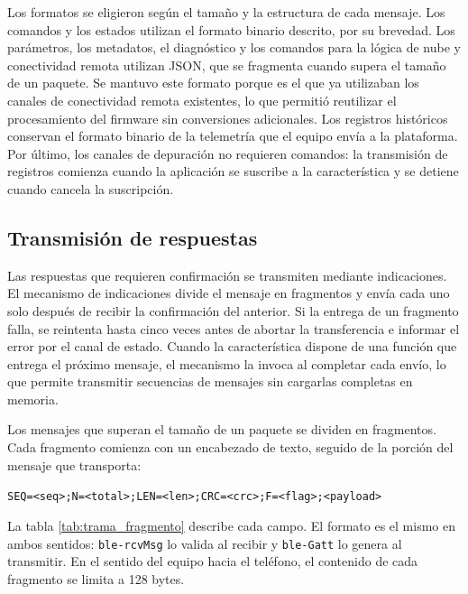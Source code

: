 Los formatos se eligieron según el tamaño y la estructura de cada mensaje. Los comandos y los estados utilizan el formato binario descrito, por su brevedad. Los parámetros, los metadatos, el diagnóstico y los comandos para la lógica de nube y conectividad remota utilizan JSON, que se fragmenta cuando supera el tamaño de un paquete. Se mantuvo este formato porque es el que ya utilizaban los canales de conectividad remota existentes, lo que permitió reutilizar el procesamiento del firmware sin conversiones adicionales. Los registros históricos conservan el formato binario de la telemetría que el equipo envía a la plataforma. Por último, los canales de depuración no requieren comandos: la transmisión de registros comienza cuando la aplicación se suscribe a la característica y se detiene cuando cancela la suscripción.

\subsection{Transmisión de respuestas}
\label{subsec:gatt_transmision}

Las respuestas que requieren confirmación se transmiten mediante indicaciones. El mecanismo de indicaciones divide el mensaje en fragmentos y envía cada uno solo después de recibir la confirmación del anterior. Si la entrega de un fragmento falla, se reintenta hasta cinco veces antes de abortar la transferencia e informar el error por el canal de estado. Cuando la característica dispone de una función que entrega el próximo mensaje, el mecanismo la invoca al completar cada envío, lo que permite transmitir secuencias de mensajes sin cargarlas completas en memoria.

Los mensajes que superan el tamaño de un paquete se dividen en fragmentos. Cada fragmento comienza con un encabezado de texto, seguido de la porción del mensaje que transporta:

\begin{center}
\texttt{SEQ=<seq>;N=<total>;LEN=<len>;CRC=<crc>;F=<flag>;<payload>}
\end{center}

La tabla \ref{tab:trama_fragmento} describe cada campo. El formato es el mismo en ambos sentidos: \texttt{ble-rcvMsg} lo valida al recibir y \texttt{ble-Gatt} lo genera al transmitir. En el sentido del equipo hacia el teléfono, el contenido de cada fragmento se limita a 128 bytes.

